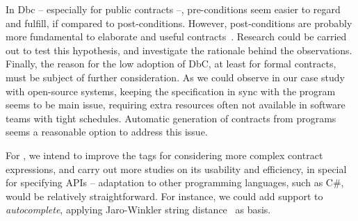 In Dbc -- especially for public contracts --, pre-conditions seem easier to regard and fulfill, if compared to post-conditions. However, post-conditions are probably more fundamental to elaborate and useful contracts~\cite{Rosenblum}. Research could be carried out to test this hypothesis, and investigate the rationale behind the observations.   
Finally, the reason for the low adoption of DbC, at least for formal contracts, must be subject of further consideration. As we could observe in our case study with open-source systems, keeping the specification in sync with the program seems to be main issue, requiring extra resources often not available in software teams with tight schedules. Automatic generation of contracts from programs~\cite{docAnalysis,atComment} seems a reasonable option to address this issue.  

For \contractjdoc{}, we intend to improve the tags for considering more complex contract expressions, and carry out more studies on its usability and efficiency, in special for specifying APIs -- adaptation to other programming languages, such as C\#, would be relatively straightforward. 
For instance, we could add support to \emph{autocomplete}, applying Jaro-Winkler string distance~\cite{jaro,winkler99} as basis.















